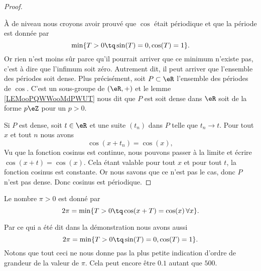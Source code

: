 \begin{proof}
\begin{subproof}
    \end{subproof}

    À de niveau nous croyons avoir prouvé que \( \cos\) était périodique et que la période est donnée par
    \begin{equation}
        \min\{ T>0\tq \sin(T)=0,\cos(T)=1 \}.
    \end{equation}
    Or rien n'est moins sûr parce qu'il pourrait arriver que ce minimum n'existe pas, c'est à dire que l'infimum soit zéro. Autrement dit, il peut arriver que l'ensemble des périodes soit dense. Plus précisément, soit \( P\subset \eR\) l'ensemble des périodes de \( \cos\). C'est un sous-groupe de \( (\eR,+)\) et le lemme \ref{LEMooPQWWooMdPWUT} nous dit que \( P\) est soit dense dans \( \eR\) soit de la forme \( p\eZ\) pour un \( p>0\).

    Si \( P\) est dense, soit \( t\in \eR\) et une suite \( (t_n)\) dans \( P\) telle que \( t_n\to t\). Pour tout \( x\) et tout \( n\) nous avons
    \begin{equation}
        \cos(x+t_n)=\cos(x),
    \end{equation}
    Vu que la fonction cosinus est continue, nous pouvons passer à la limite et écrire \( \cos(x+t)=\cos(x)\). Cela étant valable pour tout \( x\) et pour tout \( t\), la fonction cosinus est constante. Or nous savons que ce n'est pas le cas, donc \( P\) n'est pas dense. Donc cosinus est périodique.
\end{proof}

\begin{definition}[Le nombre \( \pi\)]
    Le nombre \( \pi>0\) est donné par
    \begin{equation}
        2\pi=\min\{ T>0\tq \cos(x+T)=\cos(x)\,\forall x \}.
    \end{equation}
\end{definition}
Par ce qui a été dit dans la démonstration nous avons aussi
\begin{equation}
    2\pi=\min\{ T>0\tq \sin(T)=0,\cos(T)=1 \}.
\end{equation}
Notons que tout ceci ne nous donne pas la plus petite indication d'ordre de grandeur de la valeur de \( \pi\). Cela peut encore être \( 0.1\) autant que \( 500\).

